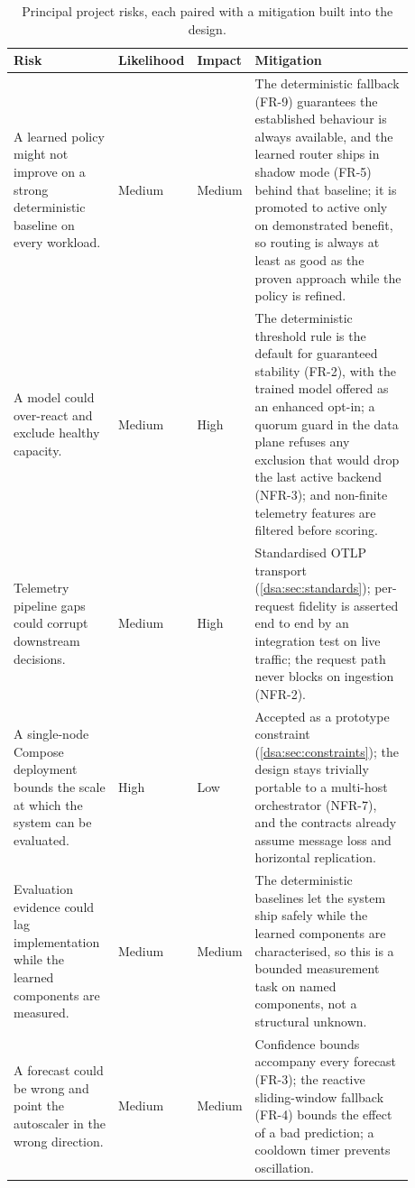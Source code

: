 \begin{table}[H]
\centering
\caption[Principal project risks and their mitigations]{Principal project risks, each paired with a mitigation built into the design.}
\label{dsa:tab:risks}
\small
\renewcommand{\arraystretch}{1.25}
\begin{tabular}{@{}p{0.27\linewidth}p{0.09\linewidth}p{0.09\linewidth}p{0.43\linewidth}@{}}
\toprule
\textbf{Risk} & \textbf{Likelihood} & \textbf{Impact} & \textbf{Mitigation} \\
\midrule
A learned policy might not improve on a strong deterministic baseline on every
workload. & Medium & Medium &
The deterministic fallback (FR-9) guarantees the established behaviour is always
available, and the learned router ships in shadow mode (FR-5) behind that baseline; it
is promoted to active only on demonstrated benefit, so routing is always at least as
good as the proven approach while the policy is refined. \\
A model could over-react and exclude healthy capacity. & Medium & High &
The deterministic threshold rule is the default for guaranteed stability (FR-2), with
the trained model offered as an enhanced opt-in; a quorum guard in the data plane
refuses any exclusion that would drop the last active backend (NFR-3); and non-finite
telemetry features are filtered before scoring. \\
Telemetry pipeline gaps could corrupt downstream decisions. & Medium & High &
Standardised OTLP transport (\cref{dsa:sec:standards}); per-request fidelity is asserted
end to end by an integration test on live traffic; the request path never blocks on
ingestion (NFR-2). \\
A single-node Compose deployment bounds the scale at which the system can be evaluated.
& High & Low & Accepted as a prototype constraint (\cref{dsa:sec:constraints}); the
design stays trivially portable to a multi-host orchestrator (NFR-7), and the contracts
already assume message loss and horizontal replication. \\
Evaluation evidence could lag implementation while the learned components are measured.
& Medium & Medium & The deterministic baselines let the system ship safely while the
learned components are characterised, so this is a bounded measurement task on named
components, not a structural unknown. \\
A forecast could be wrong and point the autoscaler in the wrong direction. & Medium & Medium &
Confidence bounds accompany every forecast (FR-3); the reactive sliding-window fallback
(FR-4) bounds the effect of a bad prediction; a cooldown timer prevents oscillation. \\
\bottomrule
\end{tabular}
\end{table}

